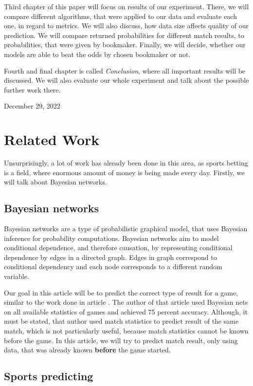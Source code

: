 \documentclass[conference]{IEEEtran}
\begin{document}
Third chapter of this paper will focus on results of our experiment. There, we will compare 
different algorithms, that were applied to our data and evaluate each one, in regard to metrics.
We will also discuss, how data size affects quality of our prediction. We will compare 
returned probabilities for different match results, to probabilities, that were given by
bookmaker. Finally, we will decide, whether our models are able to beat the odds by 
chosen bookmaker or not.

Fourth and final chapter is called \emph{Conclusion}, where all important results will be 
discussed. We will also evaluate our whole experiment and talk about the possible further work 
there.
 
\hfill December 29, 2022

\section{Related Work}

Unsurprisingly, a lot of work has already been done in this area, as sports betting is a field,
where enormous amount of money is being made every day. Firstly, we will talk about 
Bayesian networks.

\subsection{Bayesian networks}

Bayesian networks are a type of probabilistic graphical model, that uses Bayesian 
inference for probability computations. Bayesian networks aim to model conditional 
dependence, and therefore causation, by representing conditional dependence by 
edges in a directed graph. Edges in graph correspond to conditional dependency and 
each node corresponds to a different random variable.

Our goal in this article will be to predict the correct type of result for a game, similar 
to the work done in article \cite{Razali_2017}. The author of that article used Bayesian
nets on all available statistics of games and achieved 75 percent accuracy. Although, it must 
be stated, that author used match statistics to predict result of the same match, which is not
particularly useful, because match statistics cannot be known before the game. In this article,
we will try to predict match result, only using data, that was already known \textbf{before}
the game started.

\subsection{Sports predicting}
\end{document}

